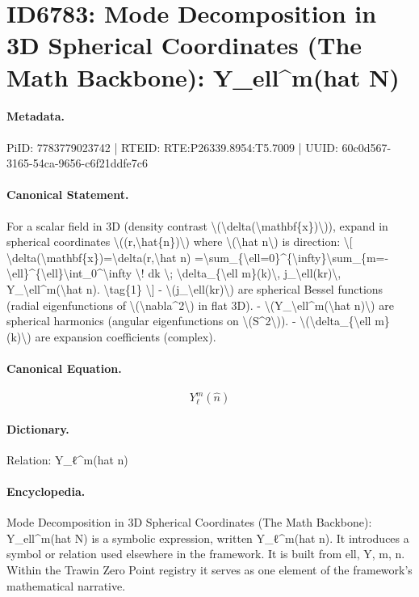 \section*{ID6783: Mode Decomposition in 3D Spherical Coordinates (The Math Backbone): Y\_ell\textasciicircum{}m(hat N)}
\paragraph{Metadata.}
PiID: 7783779023742 | RTEID: RTE:P26339.8954:T5.7009 | UUID: 60c0d567-3165-54ca-9656-c6f21ddfe7c6

\paragraph{Canonical Statement.}
For a scalar field in 3D (density contrast \textbackslash{}(\textbackslash{}delta(\textbackslash{}mathbf\{x\})\textbackslash{})), expand in spherical coordinates \textbackslash{}((r,\textbackslash{}hat\{n\})\textbackslash{}) where \textbackslash{}(\textbackslash{}hat n\textbackslash{}) is direction: \textbackslash{}[ \textbackslash{}delta(\textbackslash{}mathbf\{x\})=\textbackslash{}delta(r,\textbackslash{}hat n) =\textbackslash{}sum\_\{\textbackslash{}ell=0\}\textasciicircum{}\{\textbackslash{}infty\}\textbackslash{}sum\_\{m=-\textbackslash{}ell\}\textasciicircum{}\{\textbackslash{}ell\}\textbackslash{}int\_0\textasciicircum{}\textbackslash{}infty \textbackslash{}! dk \textbackslash{}; \textbackslash{}delta\_\{\textbackslash{}ell m\}(k)\textbackslash{}, j\_\textbackslash{}ell(kr)\textbackslash{}, Y\_\textbackslash{}ell\textasciicircum{}m(\textbackslash{}hat n). \textbackslash{}tag\{1\} \textbackslash{}] - \textbackslash{}(j\_\textbackslash{}ell(kr)\textbackslash{}) are spherical Bessel functions (radial eigenfunctions of \textbackslash{}(\textbackslash{}nabla\textasciicircum{}2\textbackslash{}) in flat 3D). - \textbackslash{}(Y\_\textbackslash{}ell\textasciicircum{}m(\textbackslash{}hat n)\textbackslash{}) are spherical harmonics (angular eigenfunctions on \textbackslash{}(S\textasciicircum{}2\textbackslash{})). - \textbackslash{}(\textbackslash{}delta\_\{\textbackslash{}ell m\}(k)\textbackslash{}) are expansion coefficients (complex).

\paragraph{Canonical Equation.}
\[
Y_\ell^m(\hat n)
\]

\paragraph{Dictionary.}
Relation: Y\_ℓ\textasciicircum{}m(hat n)

\paragraph{Encyclopedia.}
Mode Decomposition in 3D Spherical Coordinates (The Math Backbone): Y\_ell\textasciicircum{}m(hat N) is a symbolic expression, written Y\_ℓ\textasciicircum{}m(hat n). It introduces a symbol or relation used elsewhere in the framework. It is built from ell, Y, m, n. Within the Trawin Zero Point registry it serves as one element of the framework's mathematical narrative.
